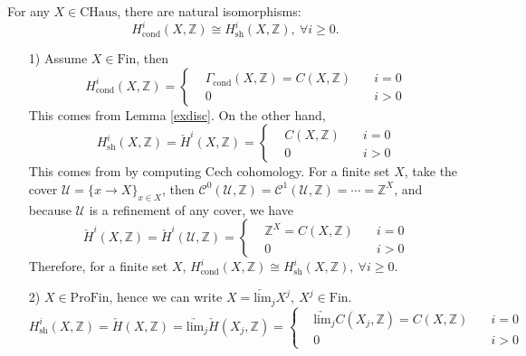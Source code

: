 \documentclass[UTF8,12,a4paper]{ctexart}
\theoremstyle{definition}
\begin{document}
\thm[Dyckhoff,1976]
For any $X\in \text{CHaus}$, there are natural isomorphisms: 
$$
H^i_{\text{cond}}(X,\mathbb{Z})\cong H^i_\text{sh}(X,\mathbb{Z}),\ \forall i\geq 0. 
$$
\pf
\begin{itemize}
	\item[1)] 
	Assume $X\in \text{Fin}$, then
	\begin{equation*}
	H^i_{\text{cond}}(X,\mathbb{Z})=\left\{
	\begin{aligned}
	&\Gamma_{\text{cond}}(X,\mathbb{Z})=C(X,\mathbb{Z}) \quad &i=0\\
	&0 \quad &i>0
	\end{aligned}
	\right.
	\end{equation*}
This comes from Lemma \ref{exdisc}. On the other hand,
  	\begin{equation*}
  	H^i_{\text{sh}}(X,\mathbb{Z})=\check{H}^i(X,\mathbb{Z})=\left\{
  	\begin{aligned}
  	&C(X,\mathbb{Z}) \quad &i=0\\
  	&0 \quad &i>0
  	\end{aligned}
  	\right.
  	\end{equation*}
  	This comes from by computing Cech cohomology. For a finite set $X$, take the cover $\mathcal{U}=\{x\to X\}_{x\in X}$, then 
  	$\mathcal{C}^0(\mathcal{U},\mathbb{Z})=\mathcal{C}^1(\mathcal{U},\mathbb{Z})=\cdots =\mathbb{Z}^X$, and because $\mathcal{U}$ is a refinement of any cover, we have
  	\begin{equation*}
    \check{H}^i(X,\mathbb{Z})=\check{H}^i(\mathcal{U},\mathbb{Z})=\left\{
  	\begin{aligned}
  	&\mathbb{Z}^X=C(X,\mathbb{Z}) \quad &i=0\\
  	&0 \quad &i>0
  	\end{aligned}
  	\right.
  	\end{equation*}
  Therefore, for a finite set $X$, $H^i_{\text{cond}}(X,\mathbb{Z})\cong H^i_\text{sh}(X,\mathbb{Z}),\ \forall i\geq 0.$
  	\item[2)] 
  	$X\in \text{ProFin}$, hence we can write $X=\underleftarrow{\text{lim}}_j X^j, \ X^j\in \text{Fin}.$
  	\begin{equation*}
  		H^i_\text{sh}(X,\mathbb{Z})=\check{H}(X,\mathbb{Z})=\underrightarrow{\text{lim}}_j \check{H}(X_j,\mathbb{Z})=\left\{
  	\begin{aligned}
  	&\underrightarrow{\text{lim}}_j C(X_j,\mathbb{Z})=C(X,\mathbb{Z}) \quad &i=0\\
  	&0 \quad &i>0
  	\end{aligned}

\end{equation*}
\end{itemize}
\end{document}
